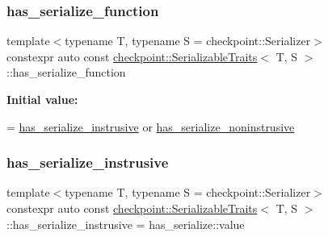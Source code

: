 \subsubsection{\texorpdfstring{has\+\_\+serialize\+\_\+function}{has\_serialize\_function}}
{\footnotesize\ttfamily template$<$typename T, typename S = checkpoint\+::\+Serializer$>$ \\
constexpr auto const \hyperlink{structcheckpoint_1_1_serializable_traits}{checkpoint\+::\+Serializable\+Traits}$<$ T, S $>$\+::has\+\_\+serialize\+\_\+function\hspace{0.3cm}{\ttfamily [static]}}

{\bfseries Initial value\+:}
\begin{DoxyCode}
=
    \hyperlink{structcheckpoint_1_1_serializable_traits_a9e6855e572198a99854e9e8d2ac8b9d7}{has\_serialize\_instrusive} or 
      \hyperlink{structcheckpoint_1_1_serializable_traits_a2b02dea52e9cce1e6ec8e251c414e2e5}{has\_serialize\_noninstrusive}
\end{DoxyCode}
\mbox{\label{structcheckpoint_1_1_serializable_traits_a9e6855e572198a99854e9e8d2ac8b9d7}} 
\subsubsection{\texorpdfstring{has\+\_\+serialize\+\_\+instrusive}{has\_serialize\_instrusive}}
{\footnotesize\ttfamily template$<$typename T, typename S = checkpoint\+::\+Serializer$>$ \\
constexpr auto const \hyperlink{structcheckpoint_1_1_serializable_traits}{checkpoint\+::\+Serializable\+Traits}$<$ T, S $>$\+::has\+\_\+serialize\+\_\+instrusive = has\+\_\+serialize\+::value\hspace{0.3cm}{\ttfamily [static]}}

\mbox{\label{structcheckpoint_1_1_serializable_traits_a2b02dea52e9cce1e6ec8e251c414e2e5}} 
